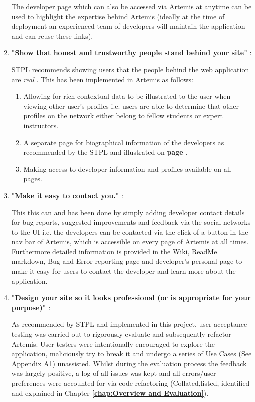 \begin{enumerate}
   The developer page which can also be accessed via Artemis at anytime can be used to highlight the expertise behind Artemis (ideally at the time of deployment an experienced team of developers will maintain the application and can reuse these links).
   
    \item \textbf{"Show that honest and trustworthy people stand behind your site"} \cite{Fogg2002a}:
    
    STPL recommends showing users that the people behind the web application are \textit{real} \cite{Fogg2002a}. This has been implemented in Artemis as follows:
    \begin{enumerate}
        \item Allowing for rich contextual data to be illustrated to the user when viewing other user's profiles i.e. users are able to determine that other profiles on the network either belong to fellow students or expert instructors.
        \item A separate page for biographical information of the developers as recommended by the STPL \cite{Fogg2002a} and illustrated on \textbf{page \pageref{developer}}.
        \item Making access to developer information and profiles available on all pages.
    \end{enumerate}
    
    \item \textbf{"Make it easy to contact you."} \cite{Fogg2002a}:
    
    This this can and has been done by simply adding developer contact details for bug reports, suggested improvements and feedback via the social networks to the UI i.e. the developers can be contacted via the click of a button in the nav bar of Artemis, which is accessible on every page of Artemis at all times. Furthermore detailed information is provided in the Wiki, ReadMe markdown, Bug and Error reporting page and developer's personal page to make it easy for users to contact the developer and learn more about the application.

    \item \textbf{"Design your site so it looks professional (or is appropriate for your purpose)"} \cite{Fogg2002a}:
    \label{proffessional}
    
    As recommended by STPL and implemented in this project, user acceptance testing was carried out to rigorously evaluate and subsequently refactor Artemis. User testers were intentionally encouraged to explore the application,  maliciously try to break it and undergo a series of Use Cases (See Appendix A1) unassisted. Whilst during the evaluation process the feedback was largely positive, a log of all issues was kept and all errors/user preferences were accounted for via code refactoring (Collated,listed, identified and explained in Chapter \textbf{\ref{chap:Overview and Evaluation}}).


\end{enumerate}
